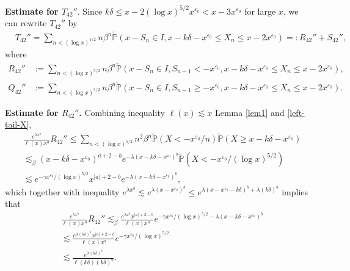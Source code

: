 \documentclass[11pt]{article}
\numberwithin{equation}{section}
\begin{document}
\noindent
{\bf Estimate for $T_{42}''$}.  Since $k\delta \leq x-2(\log x)^{5/2} x^{\varepsilon_0}< x-3x^{\varepsilon_0}$ for large $x$, we can rewrite $T_{42}''$ by 
\begin{align}\label{decom-T-42''}
	&T_{42}'' = \sum_{n< (\log x)^{5/2}}  n\beta^{n}\widetilde{\mathbb{P}}\left( x-S_n\in I,    x-k\delta-x^{\varepsilon_0}\leq X_n     \leq x-2x^{\varepsilon_0}\right)=:R_{42}''+S_{42}'',
\end{align}
where 
\begin{align}
	R_{42}'' & :=\sum_{n< (\log x)^{5/2}}  n\beta^{n}\widetilde{\mathbb{P}}\left( x-S_n\in I,  S_{n-1}<-x^{\varepsilon_0},  x-k\delta-x^{\varepsilon_0}\leq X_n     \leq x-2x^{\varepsilon_0}\right),\\
	Q_{42}''&:= \sum_{n< (\log x)^{5/2}}  n\beta^{n}\widetilde{\mathbb{P}}\left( x-S_n\in I,  S_{n-1}\geq -x^{\varepsilon_0},  x-k\delta-x^{\varepsilon_0}\leq X_n     \leq x-2x^{\varepsilon_0}\right).
\end{align}

\noindent
{\bf Estimate for $R_{42}''$.}
Combining inequality $\ell(x)\lesssim x$ Lemma \ref{lem1} and \eqref{left-tail-X}, 
\begin{align}
	& \frac{e^{\lambda x^b}}{\ell(x)x^a } R_{42}''  \leq \sum_{n< (\log x)^{5/2}}  n^2 \beta^{n}   \widetilde{\mathbb{P}}\left( X< -x^{{\varepsilon_0}}/n \right) \widetilde{\mathbb{P}}(X\geq x-k\delta-x^{\varepsilon_0}) \nonumber\\
	& \lesssim_\beta   (x-k\delta-x^{\varepsilon_0})^{a+2-b}e^{-\lambda (x-k\delta-x^{\varepsilon_0})^b} \widetilde{\mathbb{P}}\left( X< -x^{\varepsilon_0}/(\log x)^{5/2} \right)\nonumber\\
	&\lesssim e^{-\gamma x^{\varepsilon_0}/(\log x)^{5/2}} x^{|a|+2-b} e^{-\lambda (x-k\delta-x^{\varepsilon_0})^b},
\end{align}
which together with inequality $e^{\lambda x^b}\lesssim e^{\lambda (x-x^{\varepsilon_0})^b}\leq  e^{\lambda (x-x^{\varepsilon_0}-k\delta)^b+ \lambda(k\delta)^b}$  implies that 
\begin{align}\label{e28-7}
	& \frac{e^{\lambda x^b}}{\ell(x)x^a } R_{42}''    \lesssim_\beta  \frac{e^{\lambda x^b}x^{|a|+2-b}}{\ell(x)x^a }  e^{-\gamma x^{\varepsilon_0}/(\log x)^{5/2} -\lambda (x-k\delta-x^{\varepsilon_0})^b} \nonumber\\
	&\lesssim \frac{e^{\lambda (k\delta)^b}x^{|a|+2-b}}{\ell(x)x^a }  e^{-\gamma x^{\varepsilon_0}/(\log x)^{5/2}}   \nonumber\\
	&\lesssim \frac{e^{\lambda (k\delta)^b}}{\ell(k\delta)(k\delta)^a }. 
\end{align}
\end{document}
